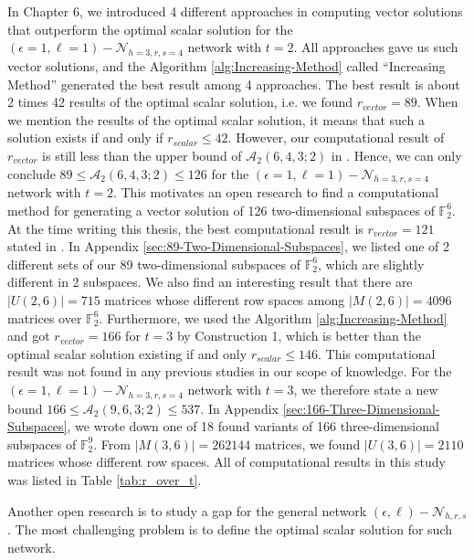 In Chapter 6, we introduced 4 different approaches in computing vector
solutions that outperform the optimal scalar solution for the $\left(\epsilon=1,\ell=1\right)-\mathcal{N}_{h=3,r,s=4}$
network with $t=2$. All approaches gave us such vector solutions,
and the Algorithm \ref{alg:Increasing-Method} called ``Increasing
Method'' generated the best result among 4 approaches. The best result
is about 2 times 42 results of the optimal scalar solution, i.e. we
found $r_{vector}=89$. When we mention the results of the optimal
scalar solution, it means that such a solution exists if and only
if $r_{scalar}\leq42$. However, our computational result of $r_{vector}$
is still less than the upper bound of $\mathcal{A}_{2}\left(6,4,3;2\right)$
in \cite{Etzion:2018}. Hence, we can only conclude $89\leq\mathcal{A}_{2}\left(6,4,3;2\right)\leq126$
for the $\left(\epsilon=1,\ell=1\right)-\mathcal{N}_{h=3,r,s=4}$
network with $t=2$. This motivates an open research to find a computational
method for generating a vector solution of 126 two-dimensional subspaces
of $\ensuremath{\mathbb{F}}_{2}^{6}$. At the time writing this thesis,
the best computational result is $r_{vector}=121$ stated in \cite{Etzion:2018}.
In Appendix \ref{sec:89-Two-Dimensional-Subspaces}, we listed one
of 2 different sets of our 89 two-dimensional subspaces of $\ensuremath{\mathbb{F}}_{2}^{6}$,
which are slightly different in 2 subspaces. We also find an interesting
result that there are $\left|U(2,6)\right|=715$ matrices whose different
row spaces among $\left|M(2,6)\right|=4096$ matrices over $\ensuremath{\mathbb{F}}_{2}^{6}$.
Furthermore, we used the Algorithm \ref{alg:Increasing-Method} and
got $r_{vector}=166$ for $t=3$ by Construction 1, which is better
than the optimal scalar solution existing if and only $r_{scalar}\leq146$.
This computational result was not found in any previous studies in
our scope of knowledge. For the $\left(\epsilon=1,\ell=1\right)-\mathcal{N}_{h=3,r,s=4}$
network with $t=3$, we therefore state a new bound $166\leq\mathcal{A}_{2}\left(9,6,3;2\right)\leq537$.
In Appendix \ref{sec:166-Three-Dimensional-Subspaces}, we wrote down
one of 18 found variants of 166 three-dimensional subspaces of $\ensuremath{\mathbb{F}}_{2}^{9}$.
From $\left|M(3,6)\right|=262144$ matrices, we found $\left|U(3,6)\right|=2110$
matrices whose different row spaces. All of computational results
in this study was listed in Table \ref{tab:r_over_t}. 

Another open research is to study a gap for the general network $\left(\epsilon,\ell\right)-\mathcal{N}_{h,r,s}$.
The most challenging problem is to define the optimal scalar solution
for such network.

\clearpage